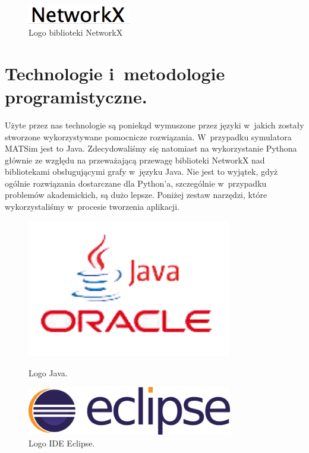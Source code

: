 \documentclass[twoside,12pt]{report}
\begin{document}
\begin{figure}[ht]
\centering
\includegraphics[width=0.40\textwidth]{img/networkx}
\caption{Logo biblioteki NetworkX} 
\end{figure}

\section{Technologie i~metodologie programistyczne.}

Użyte przez nas technologie są poniekąd wymuszone przez języki w~jakich zostały stworzone wykorzystywane pomocnicze rozwiązania. W~przypadku symulatora MATSim jest to Java. Zdecydowaliśmy się natomiast na wykorzystanie Pythona głównie ze względu na przeważającą przewagę biblioteki NetworkX nad bibliotekami obsługującymi grafy w~języku Java. Nie jest to wyjątek, gdyż ogólnie rozwiązania dostarczane dla Python'a, szczególnie w~przypadku problemów akademickich, są dużo lepsze. Poniżej zestaw narzędzi, które wykorzystaliśmy w~procesie tworzenia aplikacji.  

\begin{figure}[ht]
\begin{flushleft}
	\begin{minipage}[]{.47\textwidth}
	\centering
	\includegraphics[width=0.8\textwidth]{img/java}
	\caption{Logo Java.}
\end{minipage}%
\end{flushleft}
\begin{flushright}
	\begin{minipage}[]{.47\textwidth}
	\centering
	\includegraphics[width=0.8\textwidth]{img/eclipse}
	\caption{Logo IDE Eclipse.}	
	\end{minipage}
\end{flushright}
\end{figure}
\end{document}
